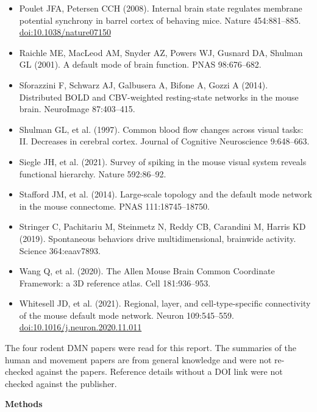 \documentclass[10pt,a4paper]{article}
\begin{document}
\begin{itemize}
\item Poulet JFA, Petersen CCH (2008). Internal brain state regulates membrane potential synchrony in barrel cortex of behaving mice. Nature 454:881--885. \href{https://www.nature.com/articles/nature07150}{doi:10.1038/nature07150}
\item Raichle ME, MacLeod AM, Snyder AZ, Powers WJ, Gusnard DA, Shulman GL (2001). A default mode of brain function. PNAS 98:676--682.
\item Sforazzini F, Schwarz AJ, Galbusera A, Bifone A, Gozzi A (2014). Distributed BOLD and CBV-weighted resting-state networks in the mouse brain. NeuroImage 87:403--415.
\item Shulman GL, et al. (1997). Common blood flow changes across visual tasks: II. Decreases in cerebral cortex. Journal of Cognitive Neuroscience 9:648--663.
\item Siegle JH, et al. (2021). Survey of spiking in the mouse visual system reveals functional hierarchy. Nature 592:86--92.
\item Stafford JM, et al. (2014). Large-scale topology and the default mode network in the mouse connectome. PNAS 111:18745--18750.
\item Stringer C, Pachitariu M, Steinmetz N, Reddy CB, Carandini M, Harris KD (2019). Spontaneous behaviors drive multidimensional, brainwide activity. Science 364:eaav7893.
\item Wang Q, et al. (2020). The Allen Mouse Brain Common Coordinate Framework: a 3D reference atlas. Cell 181:936--953.
\item Whitesell JD, et al. (2021). Regional, layer, and cell-type-specific connectivity of the mouse default mode network. Neuron 109:545--559. \href{https://doi.org/10.1016/j.neuron.2020.11.011}{doi:10.1016/j.neuron.2020.11.011}
\end{itemize}
{\small\color{muted} The four rodent DMN papers were read for this report. The summaries of the human and movement papers are from general knowledge and were not re-checked against the papers. Reference details without a DOI link were not checked against the publisher.}

\clearpage
{\LARGE\bfseries Methods}\par\smallskip{\color{accent}\rule{\linewidth}{0.8pt}}\par\medskip
\end{document}
